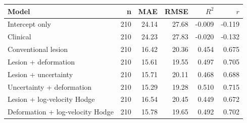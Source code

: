 \begin{tabular}{lrrrrr}
\toprule
Model & n & MAE & RMSE & $R^2$ & $r$ \\
\midrule
Intercept only & 210 & 24.14 & 27.68 & -0.009 & -0.119 \\
Clinical & 210 & 24.23 & 27.83 & -0.020 & -0.132 \\
Conventional lesion & 210 & 16.42 & 20.36 & 0.454 & 0.675 \\
Lesion + deformation & 210 & 15.61 & 19.55 & 0.497 & 0.705 \\
Lesion + uncertainty & 210 & 15.71 & 20.11 & 0.468 & 0.688 \\
Uncertainty + deformation & 210 & 15.29 & 19.28 & 0.510 & 0.715 \\
Lesion + log-velocity Hodge & 210 & 16.54 & 20.45 & 0.449 & 0.672 \\
Deformation + log-velocity Hodge & 210 & 15.78 & 19.65 & 0.492 & 0.702 \\
\bottomrule
\end{tabular}
